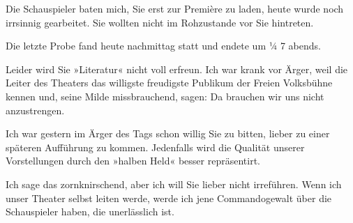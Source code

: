 \pstart
           Die Schauspieler baten mich, Sie erst zur Première zu laden, heute wurde noch irrsinnig
               gearbeitet. Sie wollten nicht im Rohzustande vor Sie hintreten.\pend
           
\pstart
           Die letzte Probe fand heute nachmittag statt und endete um ¼ 7
               abends.\pend
           
\pstart
           Leider wird Sie »Literatur« nicht voll erfreun.
               Ich war krank vor Ärger, weil die Leiter des Theaters das willigste  freudigste Publikum der Freien Volksbühne kennen und, seine Milde missbrauchend, sagen: Da
               brauchen wir uns nicht anzustrengen.\pend
           
\pstart
           {\pb}Ich war gestern im Ärger des Tags schon
               willig Sie zu bitten, lieber zu einer späteren Aufführung zu kommen. Jedenfalls wird
               die Qualität unserer Vorstellungen durch den »halben
                  Held« besser repräsentirt.\pend
           
\pstart
           Ich sage das zornknirschend, aber ich will Sie lieber nicht irreführen. Wenn ich
               unser Theater selbst leiten werde, werde ich jene {\pb}Commandogewalt über die Schauspieler haben,
               die unerlässlich ist.\pend
           
